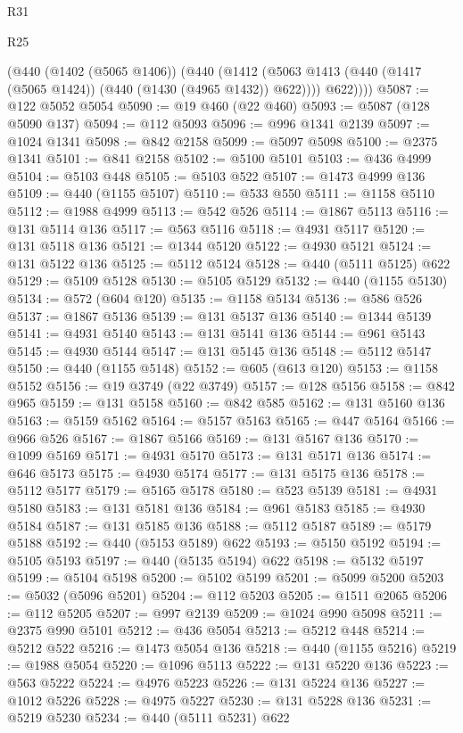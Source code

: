 \begin{lexlean}{R31}
\begin{lexlean}{R25}
\begin{coremodule}
{{{{{{{{{{{{{{{{{{{{{{{{{{{{{{{{{{{{{{{{{{{{{{{{{{{{{{{{{{{{{{{{{{{{{{{{{{{{{{{{{{{{{{{{{{{{{{{{{{{{{{{{{{{{{{{{{{{{{{{{{{{{{{{{{{{{{{{{{{{{{{{{{{{{{{{{{{{{{{{{{{{{{{{{{{{{{{{{{{{{{{{{{{{{{{{{{{{{{{{        (@440
          (@1402 (@5065 @1406))
          (@440
            (@1412 (@5063 @1413 (@440 (@1417 (@5065 @1424)) (@440 (@1430 (@4965 @1432)) @622))))
            @622))))
@5087 := @122 @5052 @5054
@5090 := @19 @460 (@22 @460)
@5093 := @5087 (@128 @5090 @137)
@5094 := @112 @5093
@5096 := @996 @1341 @2139
@5097 := @1024 @1341
@5098 := @842 @2158
@5099 := @5097 @5098
@5100 := @2375 @1341
@5101 := @841 @2158
@5102 := @5100 @5101
@5103 := @436 @4999
@5104 := @5103 @448
@5105 := @5103 @522
@5107 := @1473 @4999 @136
@5109 := @440 (@1155 @5107)
@5110 := @533 @550
@5111 := @1158 @5110
@5112 := @1988 @4999
@5113 := @542 @526
@5114 := @1867 @5113
@5116 := @131 @5114 @136
@5117 := @563 @5116
@5118 := @4931 @5117
@5120 := @131 @5118 @136
@5121 := @1344 @5120
@5122 := @4930 @5121
@5124 := @131 @5122 @136
@5125 := @5112 @5124
@5128 := @440 (@5111 @5125) @622
@5129 := @5109 @5128
@5130 := @5105 @5129
@5132 := @440 (@1155 @5130)
@5134 := @572 (@604 @120)
@5135 := @1158 @5134
@5136 := @586 @526
@5137 := @1867 @5136
@5139 := @131 @5137 @136
@5140 := @1344 @5139
@5141 := @4931 @5140
@5143 := @131 @5141 @136
@5144 := @961 @5143
@5145 := @4930 @5144
@5147 := @131 @5145 @136
@5148 := @5112 @5147
@5150 := @440 (@1155 @5148)
@5152 := @605 (@613 @120)
@5153 := @1158 @5152
@5156 := @19 @3749 (@22 @3749)
@5157 := @128 @5156
@5158 := @842 @965
@5159 := @131 @5158
@5160 := @842 @585
@5162 := @131 @5160 @136
@5163 := @5159 @5162
@5164 := @5157 @5163
@5165 := @447 @5164
@5166 := @966 @526
@5167 := @1867 @5166
@5169 := @131 @5167 @136
@5170 := @1099 @5169
@5171 := @4931 @5170
@5173 := @131 @5171 @136
@5174 := @646 @5173
@5175 := @4930 @5174
@5177 := @131 @5175 @136
@5178 := @5112 @5177
@5179 := @5165 @5178
@5180 := @523 @5139
@5181 := @4931 @5180
@5183 := @131 @5181 @136
@5184 := @961 @5183
@5185 := @4930 @5184
@5187 := @131 @5185 @136
@5188 := @5112 @5187
@5189 := @5179 @5188
@5192 := @440 (@5153 @5189) @622
@5193 := @5150 @5192
@5194 := @5105 @5193
@5197 := @440 (@5135 @5194) @622
@5198 := @5132 @5197
@5199 := @5104 @5198
@5200 := @5102 @5199
@5201 := @5099 @5200
@5203 := @5032 (@5096 @5201)
@5204 := @112 @5203
@5205 := @1511 @2065
@5206 := @112 @5205
@5207 := @997 @2139
@5209 := @1024 @990 @5098
@5211 := @2375 @990 @5101
@5212 := @436 @5054
@5213 := @5212 @448
@5214 := @5212 @522
@5216 := @1473 @5054 @136
@5218 := @440 (@1155 @5216)
@5219 := @1988 @5054
@5220 := @1096 @5113
@5222 := @131 @5220 @136
@5223 := @563 @5222
@5224 := @4976 @5223
@5226 := @131 @5224 @136
@5227 := @1012 @5226
@5228 := @4975 @5227
@5230 := @131 @5228 @136
@5231 := @5219 @5230
@5234 := @440 (@5111 @5231) @622
}}}}}}}}}}}}}}}}}}}}}}}}}}}}}}}}}}}}}}}}}}}}}}}}}}}}}}}}}}}}}}}}}}}}}}}}}}}}}}}}}}}}}}}}}}}}}}}}}}}}}}}}}}}}}}}}}}}}}}}}}}}}}}}}}}}}}}}}}}}}}}}}}}}}}}}}}}}}}}}}}}}}}}}}}}}}}}}}}}}}}}}}}}}}}}}}}}}}}}}
\end{coremodule}
\end{lexlean}
\end{lexlean}
